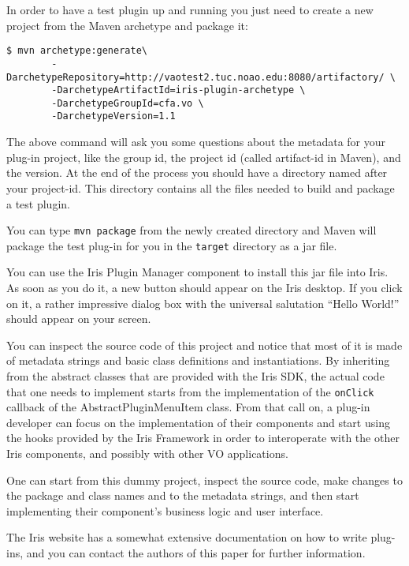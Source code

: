 In order to have a test plugin up and running you just need to create a new project from the Maven archetype and package it:
\begin{verbatim}
$ mvn archetype:generate\
        -DarchetypeRepository=http://vaotest2.tuc.noao.edu:8080/artifactory/ \
        -DarchetypeArtifactId=iris-plugin-archetype \
        -DarchetypeGroupId=cfa.vo \
        -DarchetypeVersion=1.1
\end{verbatim}

The above command will ask you some questions about the metadata for your plug-in project, like the group id, the project id (called artifact-id in Maven), and the version. At the end of the process you should have a directory named after your project-id. This directory contains all the files needed to build and package a test plugin.

You can type \verb|mvn package| from the newly created directory and Maven will package the test plug-in for you in the \verb|target| directory as a jar file.

You can use the Iris Plugin Manager component to install this jar file into Iris. As soon as you do it, a new button should appear on the Iris desktop. If you click on it, a rather impressive dialog box with the universal salutation ``Hello World!'' should appear on your screen.

You can inspect the source code of this project and notice that most of it is made of metadata strings and basic class definitions and instantiations. By inheriting from the abstract classes that are provided with the Iris SDK, the actual code that one needs to implement starts from the implementation of the \verb|onClick| callback of the AbstractPluginMenuItem class. From that call on, a plug-in developer can focus on the implementation of their components and start using the hooks provided by the Iris Framework in order to interoperate with the other Iris components, and possibly with other VO applications.

One can start from this dummy project, inspect the source code, make changes to the package and class names and to the metadata strings, and then start implementing their component's business logic and user interface.

The Iris website has a somewhat extensive documentation on how to write plug-ins, and you can contact the authors of this paper for further information.